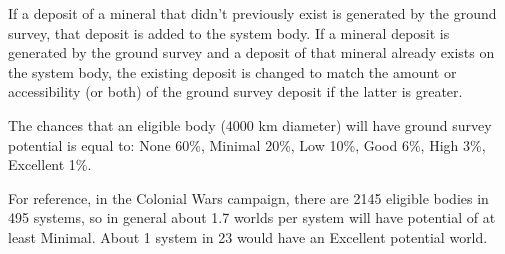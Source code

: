 \documentclass[../../Aurora C# unofficial manual.tex]{subfiles}
\begin{document}
	If a deposit of a mineral that didn't previously exist is generated by the ground survey, that deposit is added to the system body.
	If a mineral deposit is generated by the ground survey and a deposit of that mineral already exists on the system body, the existing deposit is changed to match the amount or accessibility (or both) of the ground survey deposit if the latter is greater.
	
	The chances that an eligible body (4000 km diameter) will have ground survey potential is equal to:
	None 60\%, Minimal 20\%, Low 10\%, Good 6\%, High 3\%, Excellent 1\%.
	
	For reference, in the Colonial Wars campaign, there are 2145 eligible bodies in 495 systems, so in general about 1.7 worlds per system will have potential of at least Minimal. About 1 system in 23 would have an Excellent potential world.
\end{document}
